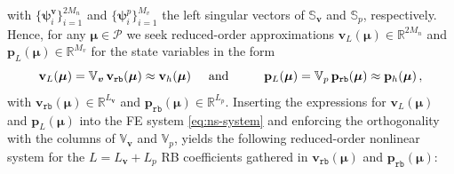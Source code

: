 \documentclass[12pt, a4paper, twoside, openright, notitlepage]{report}
\numberwithin{equation}{chapter}
\theoremstyle{theorem}
\theoremstyle{definition}
\theoremstyle{remark}
\theoremstyle{proposition}
\numberwithin{figure}{chapter}
\newcommand{\bg}[1]{\boldsymbol{#1}}
\begin{document}
		with $\big\lbrace \bg{\psi}_i^{\bg{v}} \big\rbrace_{i = 1}^{2 M_n}$ and $\big\lbrace \bg{\psi}_i^{p} \big\rbrace_{i = 1}^{M_v}$ the left singular vectors of $\mathbb{S}_{\bg{v}}$ and $\mathbb{S}_p$, respectively. Hence, for any $\bg{\mu} \in \mathcal{P}$ we seek reduced-order approximations $\mathbf{v}_{L}(\bg{\mu}) \in \mathbb{R}^{2 M_n}$ and $\mathbf{p}_{L}(\bg{\mu}) \in \mathbb{R}^{M_v}$ for the state variables in the form
		\begin{equation*}
			\mathbf{v}_{L}(\bg{\mu}) = \mathbb{V}_{\bg{v}} \, \mathbf{v}_{\texttt{rb}}(\bg{\mu}) \approx \mathbf{v}_h(\bg{\mu}) \hspace*{0.5cm} \text{and} \hspace*{0.5cm} \hspace*{0.5cm} \mathbf{p}_{L}(\bg{\mu}) = \mathbb{V}_p \, \mathbf{p}_{\texttt{rb}}(\bg{\mu}) \approx \mathbf{p}_h(\bg{\mu}) \, ,
		\end{equation*}
		with $\mathbf{v}_{\texttt{rb}}(\bg{\mu}) \in \mathbb{R}^{L_{\bg{v}}}$ and $\mathbf{p}_{\texttt{rb}}(\bg{\mu}) \in \mathbb{R}^{L_p}$. Inserting the expressions for $\mathbf{v}_{L}(\bg{\mu})$ and $\mathbf{p}_{L}(\bg{\mu})$ into the FE system \eqref{eq:ns-system} and enforcing the orthogonality with the columns of $\mathbb{V}_{\bg{v}}$ and $\mathbb{V}_p$, yields the following reduced-order nonlinear system for the $L = L_{\bg{v}} + L_p$ RB coefficients gathered in $\mathbf{v}_{\texttt{rb}}(\bg{\mu})$ and $\mathbf{p}_{\texttt{rb}}(\bg{\mu})$:
\end{document}
